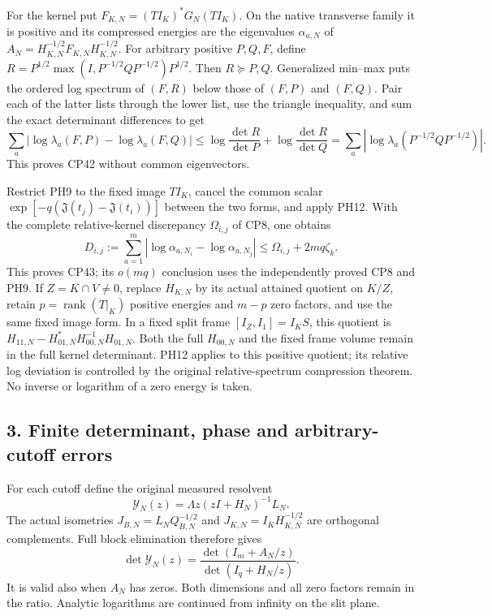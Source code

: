 \documentclass[10pt]{article}
\begin{document}
For the kernel put \(F_{K,N}=(TI_K)^*G_N(TI_K)\). On the native transverse family it is positive and its compressed energies are the eigenvalues \(\alpha_{a,N}\) of \(A_N=H_{K,N}^{-1/2}F_{K,N}H_{K,N}^{-1/2}\). For arbitrary positive \(P,Q,F\), define \(R=P^{1/2}\max(I,P^{-1/2}QP^{-1/2})P^{1/2}\). Then \(R\succeq P,Q\). Generalized min--max puts the ordered log spectrum of \((F,R)\) below those of \((F,P)\) and \((F,Q)\). Pair each of the latter lists through the lower list, use the triangle inequality, and sum the exact determinant differences to get \[
 \sum_a|\log\lambda_a(F,P)-\log\lambda_a(F,Q)|
 \le\log\frac{\det R}{\det P}+\log\frac{\det R}{\det Q}
 =\sum_a|\log\lambda_a(P^{-1/2}QP^{-1/2})|.
 \tag{PH12}
\] This proves CP42 without common eigenvectors.

Restrict PH9 to the fixed image \(TI_K\), cancel the common scalar \(\exp[-q(\mathfrak J(t_j)-\mathfrak J(t_i))]\) between the two forms, and apply PH12. With the complete relative-kernel discrepancy \(\Omega_{i,j}\) of CP8, one obtains \[
 D_{i,j}:=\sum_{a=1}^{m}|\log\alpha_{a,N_i}-\log\alpha_{a,N_j}|
 \le \Omega_{i,j}+2mq\zeta_k.
 \tag{PH13}
\] This proves CP43; its \(o(mq)\) conclusion uses the independently proved CP8 and PH9. If \(Z=K\cap V\ne0\), replace \(H_{K,N}\) by its actual attained quotient on \(K/Z\), retain \(p=\operatorname{rank}(T|_K)\) positive energies and \(m-p\) zero factors, and use the same fixed image form. In a fixed split frame \([I_Z,I_1]=I_KS\), this quotient is \(H_{11,N}-H_{01,N}^*H_{00,N}^{-1}H_{01,N}\). Both the full \(H_{00,N}\) and the fixed frame volume remain in the full kernel determinant. PH12 applies to this positive quotient; its relative log deviation is controlled by the original relative-spectrum compression theorem. No inverse or logarithm of a zero energy is taken.

\subsection{3. Finite determinant, phase and arbitrary-cutoff errors}\label{finite-determinant-phase-and-arbitrary-cutoff-errors}

For each cutoff define the original measured resolvent \[
 \mathscr Y_N(z)=\Lambda z(zI+H_N)^{-1}L_N .
\] The actual isometries \(J_{B,N}=L_NQ_{B,N}^{-1/2}\) and \(J_{K,N}=I_KH_{K,N}^{-1/2}\) are orthogonal complements. Full block elimination therefore gives \[
 \det\mathscr Y_N(z)
 =\frac{\det(I_m+A_N/z)}{\det(I_q+H_N/z)} .
 \tag{PH14}
\] It is valid also when \(A_N\) has zeros. Both dimensions and all zero factors remain in the ratio. Analytic logarithms are continued from infinity on the slit plane.
\end{document}
